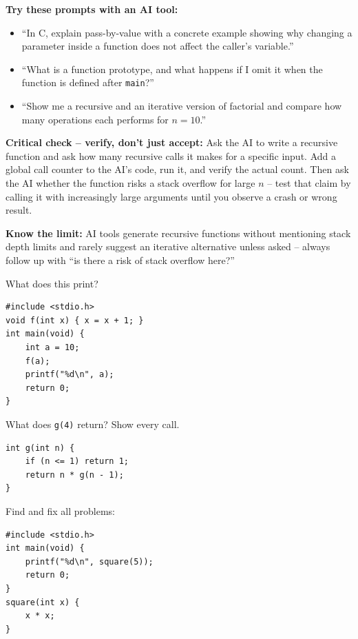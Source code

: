 \documentclass[11pt]{article}
\begin{document}
\begin{aicollab}
\textbf{Try these prompts with an AI tool:}
\begin{itemize}[leftmargin=*,nosep]
  \item ``In C, explain pass-by-value with a concrete example showing why changing a
        parameter inside a function does not affect the caller's variable.''
  \item ``What is a function prototype, and what happens if I omit it when the function
        is defined after \texttt{main}?''
  \item ``Show me a recursive and an iterative version of factorial and compare how
        many operations each performs for $n = 10$.''
\end{itemize}

\medskip\textbf{Critical check -- verify, don't just accept:}
Ask the AI to write a recursive function and ask how many recursive calls it makes for a
specific input. Add a global call counter to the AI's code, run it, and verify the actual
count. Then ask the AI whether the function risks a stack overflow for large $n$ -- test
that claim by calling it with increasingly large arguments until you observe a crash or
wrong result.

\medskip\textbf{Know the limit:}
AI tools generate recursive functions without mentioning stack depth limits and rarely
suggest an iterative alternative unless asked -- always follow up with ``is there a risk
of stack overflow here?''
\end{aicollab}

\takehomebanner

\begin{trace}
What does this print?
\begin{lstlisting}
#include <stdio.h>
void f(int x) { x = x + 1; }
int main(void) {
    int a = 10;
    f(a);
    printf("%d\n", a);
    return 0;
}
\end{lstlisting}
\end{trace}

\begin{trace}
What does \texttt{g(4)} return? Show every call.
\begin{lstlisting}
int g(int n) {
    if (n <= 1) return 1;
    return n * g(n - 1);
}
\end{lstlisting}
\end{trace}

\begin{bug}
Find and fix all problems:
\begin{lstlisting}
#include <stdio.h>
int main(void) {
    printf("%d\n", square(5));
    return 0;
}
square(int x) {
    x * x;
}
\end{lstlisting}
\end{bug}
\end{document}
